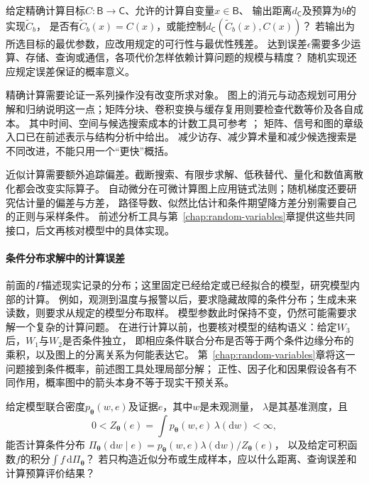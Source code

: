 \begin{mathproblem}
  \label{question:future-computation}
  给定精确计算目标$C:\mathsf B\to\mathsf C$、允许的计算自变量$x\in\mathsf B$、
  输出距离$d_{\mathsf C}$及预算为$b$的实现$\widetilde C_b$，
  是否有$\widetilde C_b(x)=C(x)$，或能控制$d_{\mathsf C}(\widetilde C_b(x),C(x))$？
  若输出为所选目标的最优参数，应改用规定的可行性与最优性残差。
  达到误差$\epsilon$需要多少运算、存储、查询或通信，各项代价怎样依赖计算问题的规模与精度？
  随机实现还应规定误差保证的概率意义。
\end{mathproblem}

精确计算需要论证一系列操作没有改变所求对象。
图上的消元与动态规划可用分解和归纳说明这一点；矩阵分块、卷积变换与缓存复用则要检查代数等价及各自成本。
其中时间、空间与候选搜索成本的计数工具可参考
；
矩阵、信号和图的章级入口已在前述表示与结构分析中给出。
减少访存、减少算术量和减少候选搜索是不同改进，不能只用一个“更快”概括。

近似计算需要额外追踪偏差。截断搜索、有限步求解、低秩替代、量化和数值离散化都会改变实际算子。
自动微分在可微计算图上应用链式法则；随机梯度还要研究估计量的偏差与方差，
路径导数、似然比估计和条件期望降方差分别需要自己的正则与采样条件。
前述分析工具与第~\ref{chap:random-variables}章提供这些共同接口，后文再核对模型中的具体实现。

\paragraph{条件分布求解中的计算误差}
\label{sec:future-analysis-probabilistic-query}

前面的$P$描述现实记录的分布；这里固定已经给定或已经拟合的模型，研究模型内部的计算。
例如，观测到温度与报警以后，要求隐藏故障的条件分布；生成未来读数，则要求从规定的模型分布取样。
模型参数此时保持不变，仍然可能需要求解一个复杂的计算问题。
在进行计算以前，也要核对模型的结构语义：给定$W_3$后，$W_1$与$W_2$是否条件独立，
即相应条件联合分布是否等于两个条件边缘分布的乘积，以及图上的分离关系为何能表达它。
第~\ref{chap:random-variables}章将这一问题接到条件概率，前述图工具处理局部分解；
正性、因子化和因果假设各有不同作用，概率图中的箭头本身不等于现实干预关系。

\begin{mathproblem}
  \label{question:future-probabilistic-query}
  给定模型联合密度$p_{\bm\theta}(w,e)$及证据$e$，其中$w$是未观测量，
  $\lambda$是其基准测度，且
  \[
    0<Z_{\bm\theta}(e)=\int p_{\bm\theta}(w,e)\,\lambda(\mathrm dw)<\infty,
  \]
  能否计算条件分布
  $\Pi_{\bm\theta}(\mathrm dw\mid e)=p_{\bm\theta}(w,e)\lambda(\mathrm dw)/Z_{\bm\theta}(e)$，
  以及给定可积函数$f$的积分$\int f\,\mathrm d\Pi_{\bm\theta}$？
  若只构造近似分布或生成样本，应以什么距离、查询误差和计算预算评价结果？
\end{mathproblem}

